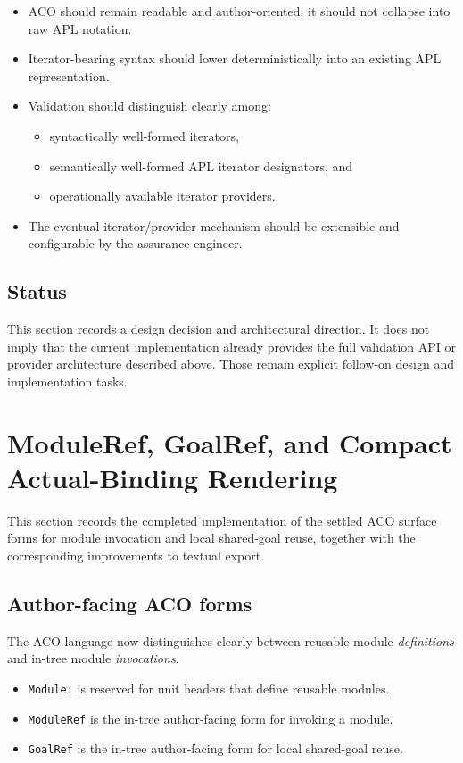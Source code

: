 \documentclass[12pt,twoside,a4paper]{article}
\begin{document}
\begin{itemize}
  \item ACO should remain readable and author-oriented; it should not collapse into raw APL notation.
  \item Iterator-bearing syntax should lower deterministically into an existing APL representation.
  \item Validation should distinguish clearly among:
  \begin{itemize}
    \item syntactically well-formed iterators,
    \item semantically well-formed APL iterator designators, and
    \item operationally available iterator providers.
  \end{itemize}
  \item The eventual iterator/provider mechanism should be extensible and configurable by the assurance engineer.
\end{itemize}

\subsection{Status}

This section records a design decision and architectural direction.
It does not imply that the current implementation already provides the full validation API or provider architecture described above.
Those remain explicit follow-on design and implementation tasks.

\section{ModuleRef, GoalRef, and Compact Actual-Binding Rendering}
\label{sec:moduleref-goalref-compact-bindings}

This section records the completed implementation of the settled ACO surface
forms for module invocation and local shared-goal reuse, together with the
corresponding improvements to textual export.

\subsection{Author-facing ACO forms}

The ACO language now distinguishes clearly between reusable module
\emph{definitions} and in-tree module \emph{invocations}.

\begin{itemize}
\item \texttt{Module:} is reserved for unit headers that define reusable modules.
\item \texttt{ModuleRef} is the in-tree author-facing form for invoking a module.
\item \texttt{GoalRef} is the in-tree author-facing form for local shared-goal reuse.
\end{itemize}
\end{document}
